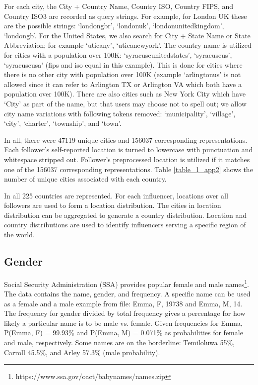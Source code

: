 For each city, the City + Country Name, Country ISO, Country FIPS, and Country ISO3 are recorded as query strings. For example, for London UK these are the possible strings: `londongbr', `londonuk', `londonunitedkingdom', `londongb'. For the United States, we also search for City + State Name or State Abbreviation; for example `uticany', `uticanewyork'. The country name is utilized for cities with a population over 100K: `syracuseunitedstates', `syracuseus', `syracuseusa' (fips and iso equal in this example). This is done for cities where there is no other city with population over 100K (example `arlingtonus' is not allowed since it can refer to Arlington TX or Arlington VA which both have a population over 100K). There are also cities such as New York City which have `City' as part of the name, but that users may choose not to spell out; we allow city name variations with following tokens removed: `municipality', `village', `city', `charter', `township', and `town'. %

In all, there were 47119 unique cities and 156037 corresponding representations. Each follower's self-reported location is turned to lowercase with punctuation and whitespace stripped out. Follower's preprocessed location is utilized if it matches one of the 156037 corresponding representations. Table \ref{table_1_app2} shows the number of unique cities associated with each country. 

In all 225 countries are represented. For each influencer, locations over all followers are used to form a location distribution. The cities in location distribution can be aggregated to generate a country distribution. Location and country distributions are used to identify influencers serving a specific region of the world.

\subsection{Gender}
Social Security Administration (SSA) provides popular female and male names\footnote{https://www.ssa.gov/oact/babynames/names.zip}. The data contains the name, gender, and frequency. A specific name can be used as a female and a male example from file: Emma, F, 19738 and Emma, M, 14. The frequency for gender divided by total frequency gives a percentage for how likely a particular name is to be male vs. female. Given frequencies for Emma, P(Emma, F) = 99.93\% and P(Emma, M) = 0.071\% as probabilities for female and male, respectively. Some names are on the borderline: Temiloluwa 55\%, Carroll 45.5\%, and Arley 57.3\% (male probability). 

